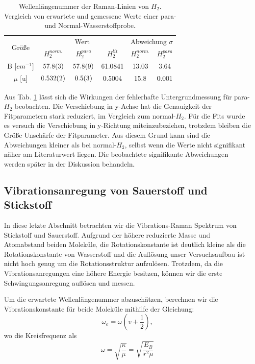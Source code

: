 \documentclass[11 pt]{article}
\begin{document}
\begin{table}[!htbp]
 \begin{center}
  \caption{\small Wellenlängenummer der Raman-Linien von $H_2$. Vergleich von erwartete und gemessene Werte einer para- und Normal-Wasserstoffprobe.}
  \label{tab:H2_B_mu}
  \renewcommand{\arraystretch}{1.3} %
  \begin{tabular}{|c|c|c|c|c|c|}
  \hline

\multirow{2}{*}{Größe}&\multicolumn{3}{c|}{Wert}& \multicolumn{2}{c|}{ Abweichung $\sigma$} \\ \cline{2-6} %
 					 &$H_2^{norm.}$	&	$H_2^{para}$ &  $H_2^{lit}$ &  $H_2^{norm.}$	&	$H_2^{para}$\\ 
  \hline
	\hline 
B [$\unit{cm^{-1}}$] & $\num{57.8\pm0.3}$ & $\num{57.8\pm0.9}$ & 61.0841 & 13.03 & 3.64 \\
$\mu$ [$\unit{\atomicmassunit}$] & $\num{0.532\pm0.002}$& $\num{0.5\pm0.3}$&0.5004 &15.8 & 0.001\\
	\hline
  \end{tabular}
  \renewcommand{\arraystretch}{1}
 \end{center}
\end{table}

Aus Tab. \ref{tab:H2_B_mu} lässt sich die Wirkungen der fehlerhafte Untergrundmessung für para-$H_2$ beobachten. Die Verschiebung in y-Achse hat die Genauigkeit der Fitparametern stark reduziert, im Vergleich zum normal-$H_2$. Für die Fits wurde es versuch die Verschiebung in y-Richtung miteinzubeziehen, trotzdem bleiben die Größe Unschärfe der Fitparameter. Aus diesem Grund kann sind die Abweichungen kleiner als bei normal-$H_2$, selbst wenn die Werte nicht signifikant näher am Literaturwert liegen. Die beobachtete signifikante Abweichungen werden später in der Diskussion behandeln. 

\subsection{Vibrationsanregung von Sauerstoff und Stickstoff}
In diese letzte Abschnitt betrachten wir die Vibrations-Raman Spektrum von Stickstoff und Sauerstoff. Aufgrund der höhere reduzierte Masse und Atomabstand beiden Moleküle, die Rotationskonstante ist deutlich kleine als die Rotationskonstante von Wasserstoff und die Auflösung unser Versuchsaufbau ist nicht hoch genug um die Rotationsstruktur aufzulösen. Trotzdem, da die Vibrationsanregungen eine höhere Energie besitzen, können wir die erste Schwingungsanregung auflösen und messen. 

Um die erwartete Wellenlängenummer abzuschätzen, berechnen wir die Vibrationskonstante für beide Moleküle mithilfe der Gleichung:
\begin{equation}
\omega_e = \omega \left( v + \dfrac{1}{2} \right),
\end{equation}
wo die Kreisfrequenz als 
\begin{equation}
\omega = \sqrt{\dfrac{\kappa}{\mu}} = \sqrt{\dfrac{E_{B}}{r^2\mu}}
\end{equation}
\end{document}
